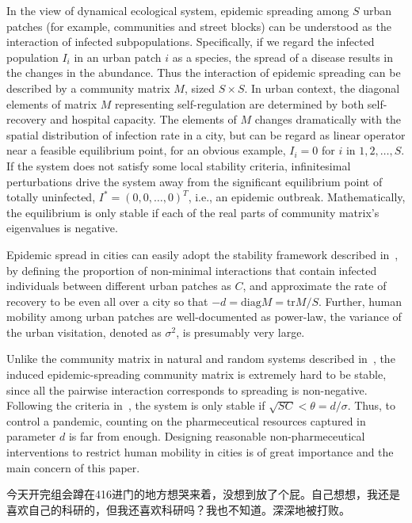 In the view of dynamical ecological system, epidemic spreading among $S$ urban patches (for example, communities and street blocks) can be understood as the interaction of infected subpopulations. Specifically, if we regard the infected population $I_{i}$ in an urban patch $i$ as a species, the spread of a disease results in the changes in the abundance. Thus the interaction of epidemic spreading can be described by a community matrix $M$, sized $S\times S$. In urban context, the diagonal elements of matrix $M$ representing self-regulation are determined by both self-recovery and hospital capacity. The elements of $M$ changes dramatically with the spatial distribution of infection rate in a city, but can be regard as linear operator near a feasible equilibrium point, for an obvious example, $I_{i} = 0$ for $i$ in $1,2,\dots, S$. If the system does not satisfy some local stability criteria, infinitesimal perturbations drive the system away from the significant equilibrium point of totally uninfected, $I^{*} = {(0,0,\dots, 0)}^T$, i.e., an epidemic outbreak. Mathematically, the equilibrium is only stable if each of the real parts of community matrix's eigenvalues is negative.

Epidemic spread in cities can easily adopt the stability framework described in~\cite{allesina2012stability}, by defining the proportion of non-minimal interactions that contain infected individuals between different urban patches as $C$, and approximate the rate of recovery to be even all over a city so that $-d = \text{diag} M = \text{tr} M / S$. Further, human mobility among urban patches are well-documented as power-law, the variance of the urban visitation, denoted as $\sigma^2$, is presumably very large.

Unlike the community matrix in natural and random systems described in~\cite{may1972will, allesina2012stability}, the induced epidemic-spreading community matrix is extremely hard to be stable, since all the pairwise interaction corresponds to spreading is non-negative. Following the criteria in~\cite{allesina2012stability}, the system is only stable if $\sqrt{SC} < \theta = d / \sigma$. Thus, to control a pandemic, counting on the pharmeceutical resources captured in parameter $d$ is far from enough. Designing reasonable non-pharmeceutical interventions to restrict human mobility in cities is of great importance and the main concern of this paper.

今天开完组会蹲在416进门的地方想哭来着，没想到放了个屁。自己想想，我还是喜欢自己的科研的，但我还喜欢科研吗？我也不知道。深深地被打败。

